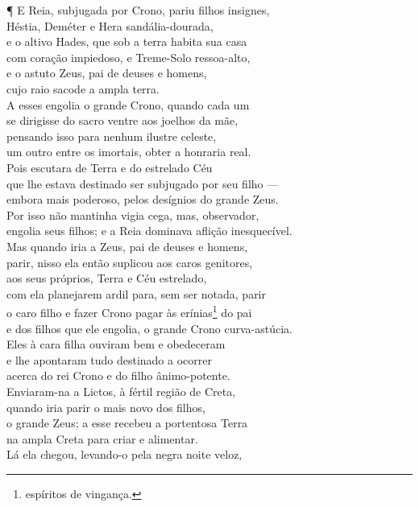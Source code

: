 ¶ E Reia, subjugada por Crono, pariu filhos insignes,\\
Héstia, Deméter e Hera sandália-dourada,\\
e o altivo Hades, que sob a terra habita sua casa \\
com coração impiedoso, e Treme-Solo ressoa-alto,\\
e o astuto Zeus, pai de deuses e homens,\\
cujo raio sacode a ampla terra.\\
A esses engolia o grande Crono, quando cada um\\
se dirigisse do sacro ventre aos joelhos da mãe, \\
pensando isso para nenhum ilustre celeste,\\
um outro entre os imortais, obter a honraria real.\\
Pois escutara de Terra e do estrelado Céu\\
que lhe estava destinado ser subjugado por seu filho ---\\
embora mais poderoso, pelos desígnios do grande Zeus. \\
Por isso não mantinha vigia cega, mas, observador,\\
engolia seus filhos; e a Reia dominava aflição inesquecível.\\
Mas quando iria a Zeus, pai de deuses e homens,\\
parir, nisso ela então suplicou aos caros genitores,\\
aos seus próprios, Terra e Céu estrelado, \\
com ela planejarem ardil para, sem ser notada, parir\\
o caro filho e fazer Crono pagar às erínias\footnote{espíritos de vingança.} do pai\\
e dos filhos que ele engolia, o grande Crono curva-astúcia.\\
Eles à cara filha ouviram bem e obedeceram\\
e lhe apontaram tudo destinado a ocorrer \\
acerca do rei Crono e do filho ânimo-potente.\\
Enviaram-na a Lictos, à fértil região de Creta,\\
quando iria parir o mais novo dos filhos,\\
o grande Zeus; a esse recebeu a portentosa Terra\\
na ampla Creta para criar e alimentar. \\
Lá ela chegou, levando-o pela negra noite veloz,\\
